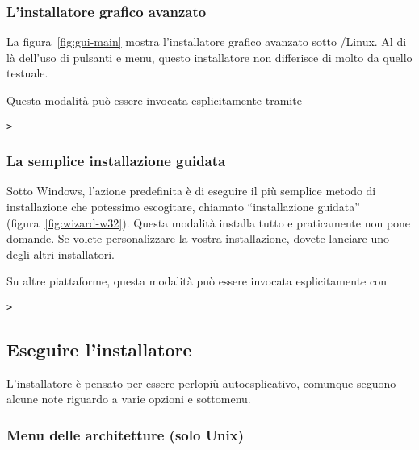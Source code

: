 \documentclass{article}
\begin{document}
\subsubsection{L'installatore grafico avanzato}

La figura~\ref{fig:gui-main} mostra l'installatore grafico avanzato sotto
\GNU/Linux. Al di là dell'uso di pulsanti e menu, questo installatore non
differisce di molto da quello testuale.

Questa modalità può essere invocata esplicitamente tramite
\begin{alltt}
> 
\end{alltt}


\subsubsection{La semplice installazione guidata}

Sotto Windows, l'azione predefinita è di eseguire il più semplice metodo
di installazione che potessimo escogitare, chiamato ``installazione
guidata'' (figura~\ref{fig:wizard-w32}). Questa modalità installa tutto e 
praticamente non pone domande. Se
volete personalizzare la vostra installazione, dovete lanciare uno degli
altri installatori.

Su altre piattaforme, questa modalità può essere invocata esplicitamente con
\begin{alltt}
> 
\end{alltt}


\subsection{Eseguire l'installatore}
\label{sec:runinstall}

L'installatore è pensato per essere perlopiù autoesplicativo, comunque seguono
alcune note riguardo a varie opzioni e sottomenu.

\subsubsection{Menu delle architetture (solo Unix)}
\label{sec:binary}
\end{document}
